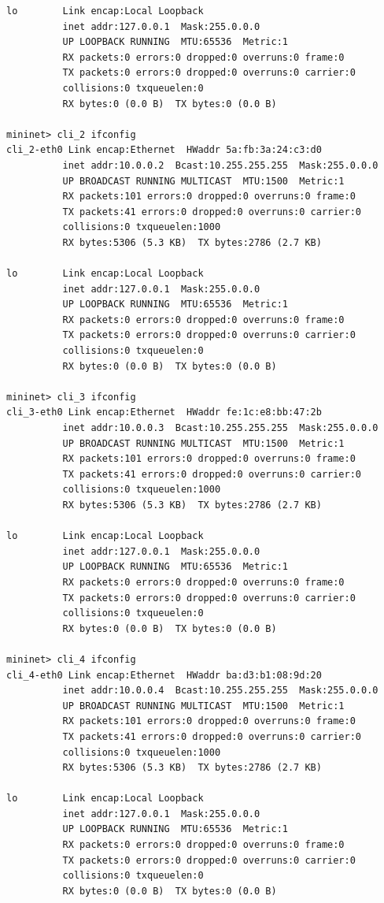 \documentclass{article}
\begin{document}
\begin{Verbatim}
lo        Link encap:Local Loopback
          inet addr:127.0.0.1  Mask:255.0.0.0
          UP LOOPBACK RUNNING  MTU:65536  Metric:1
          RX packets:0 errors:0 dropped:0 overruns:0 frame:0
          TX packets:0 errors:0 dropped:0 overruns:0 carrier:0
          collisions:0 txqueuelen:0
          RX bytes:0 (0.0 B)  TX bytes:0 (0.0 B)

mininet> cli_2 ifconfig
cli_2-eth0 Link encap:Ethernet  HWaddr 5a:fb:3a:24:c3:d0
          inet addr:10.0.0.2  Bcast:10.255.255.255  Mask:255.0.0.0
          UP BROADCAST RUNNING MULTICAST  MTU:1500  Metric:1
          RX packets:101 errors:0 dropped:0 overruns:0 frame:0
          TX packets:41 errors:0 dropped:0 overruns:0 carrier:0
          collisions:0 txqueuelen:1000
          RX bytes:5306 (5.3 KB)  TX bytes:2786 (2.7 KB)

lo        Link encap:Local Loopback
          inet addr:127.0.0.1  Mask:255.0.0.0
          UP LOOPBACK RUNNING  MTU:65536  Metric:1
          RX packets:0 errors:0 dropped:0 overruns:0 frame:0
          TX packets:0 errors:0 dropped:0 overruns:0 carrier:0
          collisions:0 txqueuelen:0
          RX bytes:0 (0.0 B)  TX bytes:0 (0.0 B)

mininet> cli_3 ifconfig
cli_3-eth0 Link encap:Ethernet  HWaddr fe:1c:e8:bb:47:2b
          inet addr:10.0.0.3  Bcast:10.255.255.255  Mask:255.0.0.0
          UP BROADCAST RUNNING MULTICAST  MTU:1500  Metric:1
          RX packets:101 errors:0 dropped:0 overruns:0 frame:0
          TX packets:41 errors:0 dropped:0 overruns:0 carrier:0
          collisions:0 txqueuelen:1000
          RX bytes:5306 (5.3 KB)  TX bytes:2786 (2.7 KB)

lo        Link encap:Local Loopback
          inet addr:127.0.0.1  Mask:255.0.0.0
          UP LOOPBACK RUNNING  MTU:65536  Metric:1
          RX packets:0 errors:0 dropped:0 overruns:0 frame:0
          TX packets:0 errors:0 dropped:0 overruns:0 carrier:0
          collisions:0 txqueuelen:0
          RX bytes:0 (0.0 B)  TX bytes:0 (0.0 B)

mininet> cli_4 ifconfig
cli_4-eth0 Link encap:Ethernet  HWaddr ba:d3:b1:08:9d:20
          inet addr:10.0.0.4  Bcast:10.255.255.255  Mask:255.0.0.0
          UP BROADCAST RUNNING MULTICAST  MTU:1500  Metric:1
          RX packets:101 errors:0 dropped:0 overruns:0 frame:0
          TX packets:41 errors:0 dropped:0 overruns:0 carrier:0
          collisions:0 txqueuelen:1000
          RX bytes:5306 (5.3 KB)  TX bytes:2786 (2.7 KB)

lo        Link encap:Local Loopback
          inet addr:127.0.0.1  Mask:255.0.0.0
          UP LOOPBACK RUNNING  MTU:65536  Metric:1
          RX packets:0 errors:0 dropped:0 overruns:0 frame:0
          TX packets:0 errors:0 dropped:0 overruns:0 carrier:0
          collisions:0 txqueuelen:0
          RX bytes:0 (0.0 B)  TX bytes:0 (0.0 B)


\end{Verbatim}
\end{document}
